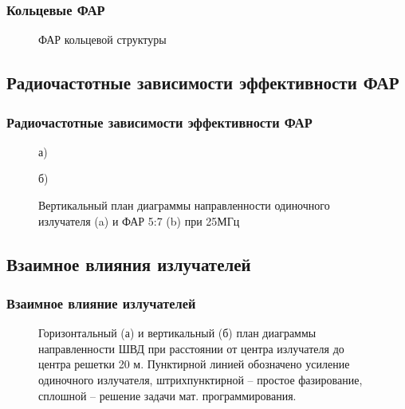 \begin{frame}
    \frametitle{Кольцевые ФАР}
    \begin{figure}
    \caption{ФАР кольцевой структуры}
    \label{ris:rings}
    \end{figure}
\end{frame}

\subsection{Радиочастотные зависимости эффективности ФАР}

\begin{frame}
    \frametitle{Радиочастотные зависимости эффективности ФАР}
\begin{figure}
\begin{minipage}[h]{0.4\linewidth}
 а)
\end{minipage}
\hfill
\begin{minipage}[h]{0.4\linewidth}
 б)
\end{minipage}
\caption{Вертикальный план диаграммы направленности одиночного излучателя (a) и ФАР 5:7 (b) при 25МГц}
\label{ris:25MHz}
\end{figure}
\end{frame}


\subsection{Взаимное влияния излучателей}

\begin{frame}
    \frametitle{Взаимное влияние излучателей}
    \begin{figure}
    \begin{minipage}[h]{0.49\linewidth}
    \end{minipage}
    \hfill
    \begin{minipage}[h]{0.49\linewidth}
    \end{minipage}
    \caption{Горизонтальный (а) и вертикальный (б) план диаграммы направленности ШВД при расстоянии от центра излучателя до центра решетки 20 м. Пунктирной линией обозначено усиление одиночного излучателя, штрихпунктирной – простое фазирование, сплошной – решение задачи мат. программирования.}
    \label{pic:r_bvd_result_2}
    \end{figure}

\end{frame}